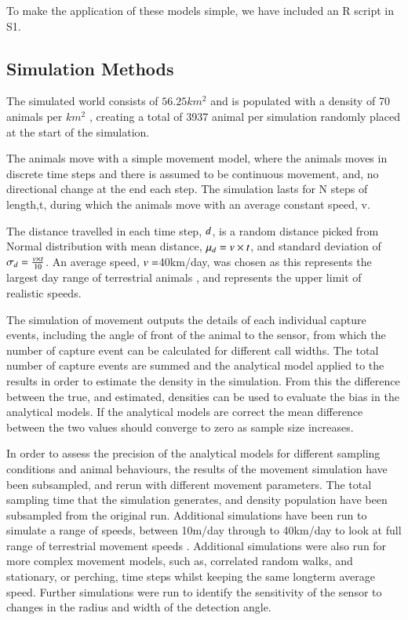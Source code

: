\documentclass[a4paper,10pt,reqno,oneside]{amsart}
\begin{document}
To make the application of these models simple, we have included an R script in S1. 

\subsection{Simulation Methods}

The simulated world consists of $56.25km^2$ and is populated with a density of  70 animals per $km^2$ \citep{damuth1981population}, creating a total of 3937 animal per simulation randomly placed at the start of the simulation. 

The animals move with a simple movement model, where the animals moves in discrete time steps and there is assumed to be continuous movement, and, no directional change at the end each step. The simulation lasts for N steps of length,t, during which the animals move with an average constant speed, v. 

The distance travelled in each time step, $\mathnormal{d}$, is a random distance picked from Normal distribution with mean distance, $\mu_d = \mathnormal{v} \times \mathnormal{t}$,  and standard deviation of $\sigma_d = \frac{\mathnormal{v} \times \mathnormal{t}}{10}$. An average speed, $\mathnormal{v} = $40km/day, was chosen as this represents the largest day range of terrestrial animals \citep{carbone2005far}, and represents the upper limit of realistic speeds.
  
The simulation of movement outputs the details of each individual capture events, including the angle of front of the animal to the sensor, from which the number of capture event can be calculated for different call widths. The total number of capture events are summed and the analytical model applied to the results in order to estimate the density in the simulation. From this the difference between the true, and estimated, densities can be used to evaluate the bias in the analytical models. If the analytical models are correct the mean difference between the two values should converge to zero as sample size increases. 

In order to assess the precision of the analytical models for different sampling conditions and animal behaviours, the results of the movement simulation have been subsampled, and rerun with different movement parameters. The total sampling time that the simulation generates, and density population have been subsampled from the original run. Additional simulations have been run to simulate a range of speeds, between 10m/day through to 40km/day to look at full range of terrestrial movement speeds \citep{carbone2005far}. Additional simulations were also run for more complex movement models, such as, correlated random walks, and stationary, or perching, time steps whilst keeping the same longterm average speed. Further simulations were run to identify the sensitivity of the sensor to changes in the radius and width of the detection angle.
\end{document}
